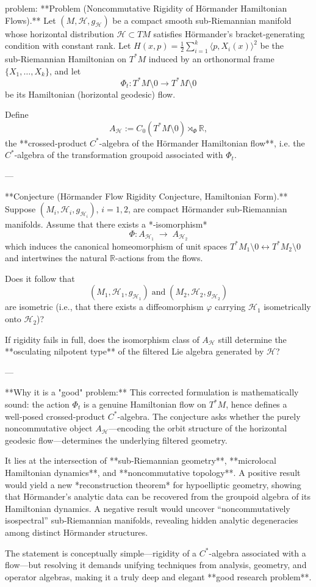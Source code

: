 problem:  
**Problem (Noncommutative Rigidity of Hörmander Hamiltonian Flows).**  
Let \( (M,\mathcal H,g_{\mathcal H}) \) be a compact smooth sub‑Riemannian manifold whose horizontal distribution \(\mathcal H\subset TM\) satisfies Hörmander’s bracket‑generating condition with constant rank.  
Let \(H(x,p)=\tfrac12\sum_{i=1}^k \langle p,X_i(x)\rangle^2\) be the sub‑Riemannian Hamiltonian on \(T^*M\) induced by an orthonormal frame \(\{X_1,\dots,X_k\}\), and let  
\[
\Phi_t: T^*M\setminus 0 \longrightarrow T^*M\setminus 0
\]
be its Hamiltonian (horizontal geodesic) flow.

Define
\[
A_{\mathcal H}:=C_0(T^*M\setminus 0)\rtimes_{\Phi}\mathbb R,
\]
the **crossed‑product \(C^*\)-algebra of the Hörmander Hamiltonian flow**, i.e. the \(C^*\)-algebra of the transformation groupoid associated with \(\Phi_t\).

---

**Conjecture (Hörmander Flow Rigidity Conjecture, Hamiltonian Form).**  
Suppose \((M_i,\mathcal H_i,g_{\mathcal H_i})\), \(i=1,2\), are compact Hörmander sub‑Riemannian manifolds.  
Assume that there exists a *‑isomorphism*
\[
\Phi: A_{\mathcal H_1} \;\longrightarrow\; A_{\mathcal H_2}
\]
which induces the canonical homeomorphism of unit spaces \(T^*M_1\setminus 0 \leftrightarrow T^*M_2\setminus 0\) and intertwines the natural \(\mathbb R\)-actions from the flows.

Does it follow that
\[
(M_1,\mathcal H_1,g_{\mathcal H_1}) \;\text{and}\; (M_2,\mathcal H_2,g_{\mathcal H_2})
\]
are isometric (i.e., that there exists a diffeomorphism \(\varphi\) carrying \(\mathcal H_1\) isometrically onto \(\mathcal H_2\))?  

If rigidity fails in full, does the isomorphism class of \(A_{\mathcal H}\) still determine the **osculating nilpotent type** of the filtered Lie algebra generated by \(\mathcal H\)?

---

**Why it is a "good" problem:**  
This corrected formulation is mathematically sound: the action \(\Phi_t\) is a genuine Hamiltonian flow on \(T^*M\), hence defines a well‑posed crossed‑product \(C^*\)-algebra.  
The conjecture asks whether the purely noncommutative object \(A_{\mathcal H}\)—encoding the orbit structure of the horizontal geodesic flow—determines the underlying filtered geometry.  

It lies at the intersection of **sub‑Riemannian geometry**, **microlocal Hamiltonian dynamics**, and **noncommutative topology**.  
A positive result would yield a new *reconstruction theorem* for hypoelliptic geometry, showing that Hörmander’s analytic data can be recovered from the groupoid algebra of its Hamiltonian dynamics.  
A negative result would uncover “noncommutatively isospectral” sub‑Riemannian manifolds, revealing hidden analytic degeneracies among distinct Hörmander structures.  

The statement is conceptually simple—rigidity of a \(C^*\)-algebra associated with a flow—but resolving it demands unifying techniques from analysis, geometry, and operator algebras, making it a truly deep and elegant **good research problem**.
